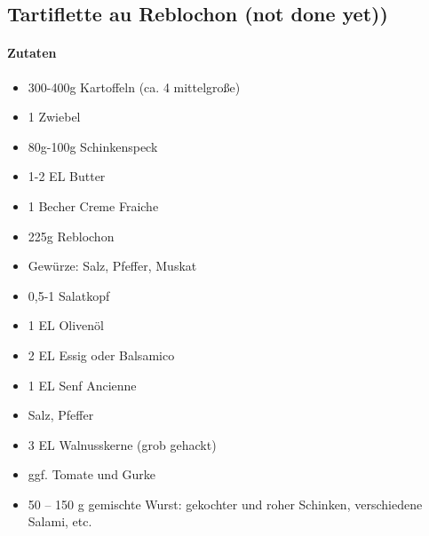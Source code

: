 \newpage
\subsection{Tartiflette au Reblochon (not done yet))}
\paragraph{Zutaten}
\begin{itemize}[noitemsep]
	\item 300-400g Kartoffeln (ca. 4 mittelgroße)
	\item 1 Zwiebel
	\item 80g-100g Schinkenspeck
	\item 1-2 EL Butter
	\item 1 Becher Creme Fraiche
	\item 225g Reblochon 
	\item Gewürze: Salz, Pfeffer, Muskat
	\vspace{0.5cm}
	\item 0,5-1 Salatkopf
	\item 1 EL Olivenöl
	\item 2 EL Essig oder Balsamico
	\item 1 EL Senf Ancienne
	\item Salz, Pfeffer
	\item 3 EL Walnusskerne (grob gehackt)
	\item ggf. Tomate und Gurke	
	\vspace{0.5cm}
	\item 50 – 150 g gemischte Wurst: gekochter und roher Schinken, verschiedene Salami, etc.
\end{itemize}
